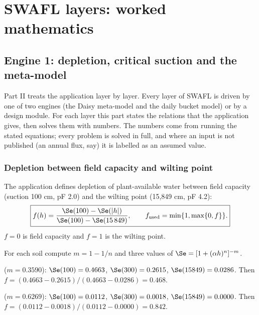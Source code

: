 \part{SWAFL layers: worked mathematics}
\chapter{Engine 1: depletion, critical suction and the meta-model}\label{ch:e1}

Part II treats the application layer by layer. Every layer of SWAFL is driven by one of two engines (the Daisy meta-model and the daily bucket model) or by a design module. For each layer this part states the relations that the application gives, then solves them with numbers. The numbers come from running the stated equations; every problem is solved in full, and where an input is not published (an annual flux, say) it is labelled as an assumed value.

\section{Depletion between field capacity and wilting point}
The application defines depletion of plant-available water between field capacity (suction 100 cm, pF 2.0) and the wilting point (15,849 cm, pF 4.2):
\begin{equation}\label{eq:fdep}\boxed{f(h)=\frac{\Se(100)-\Se(|h|)}{\Se(100)-\Se(15\,849)},\qquad f_{\rm used}=\min\{1,\max\{0,f\}\}.}\end{equation}
$f=0$ is field capacity and $f=1$ is the wilting point.

\sol  For each soil compute $m=1-1/n$ and three values of $\Se=[1+(\alpha h)^n]^{-m}$.

 ($m=0.3590$): $\Se(100)=0.4663$, $\Se(300)=0.2615$, $\Se(15849)=0.0286$. Then $f=(0.4663-0.2615)/(0.4663-0.0286)=0.468$.

 ($m=0.6269$): $\Se(100)=0.0112$, $\Se(300)=0.0018$, $\Se(15849)=0.0000$. Then $f=(0.0112-0.0018)/(0.0112-0.0000)=0.842$.

